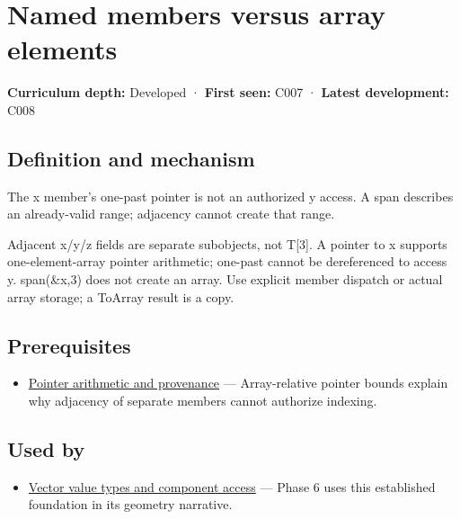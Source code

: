 \hypertarget{appendix-3f7e15effba6}{}\label{referencestart:appendix-3f7e15effba6}
\section{Named members versus array elements}\label{appendix-3f7e15effba6-named-members-versus-array-elements}

\textbf{Curriculum depth:} Developed · \textbf{First seen:} C007 · \textbf{Latest development:} C008

\subsection{Definition and mechanism}\label{appendix-3f7e15effba6-definition-and-mechanism}

The x member's one-past pointer is not an authorized y access. A span describes an already-valid range; adjacency cannot create that range.

Adjacent x/y/z fields are separate subobjects, not T{[}3{]}. A pointer to x supports one-element-array pointer arithmetic; one-past cannot be dereferenced to access y. span(\&x,3) does not create an array. Use explicit member dispatch or actual array storage; a ToArray result is a copy.

\subsection{Prerequisites}\label{appendix-3f7e15effba6-prerequisites}

\begin{itemize}
\tightlist
\item
  \hyperref[appendix-6af5921bc853]{Pointer arithmetic and provenance} --- Array-relative pointer bounds explain why adjacency of separate members cannot authorize indexing.
\end{itemize}

\subsection{Used by}\label{appendix-3f7e15effba6-used-by}

\begin{itemize}
\tightlist
\item
  \hyperref[appendix-37a39984ba66]{Vector value types and component access} --- Phase 6 uses this established foundation in its geometry narrative.
\end{itemize}

